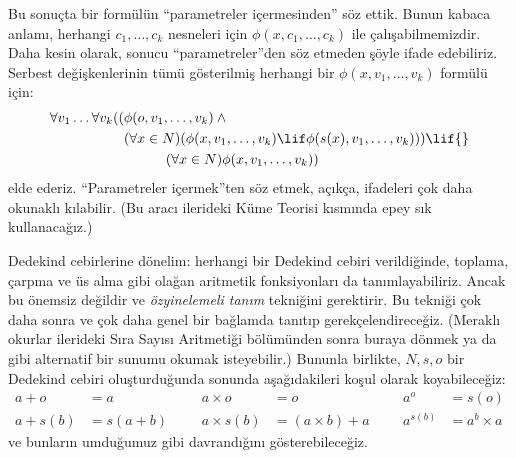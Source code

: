 Bu sonuçta bir formülün ``parametreler içermesinden'' söz ettik. Bunun
kabaca anlamı, herhangi $c_1,\ldots,c_k$ nesneleri için
$\phi(x,c_1,\ldots,c_k)$ ile çalışabilmemizdir. Daha kesin olarak, sonucu
``parametreler''den söz etmeden şöyle ifade edebiliriz. Serbest değişkenlerinin
tümü gösterilmiş herhangi bir $\phi(x,v_1,\ldots,v_k)$ formülü için:
	\begin{align*}
			\forall v_1 \ldots \forall v_k((&\phi(o, v_1,\ldots, v_k) \land {}\\
			&	(\forall x \in N)(\phi(x,v_1, \ldots, v_k) \lif \phi(s(x), v_1,\ldots, v_k))) \lif {}\\
			&\hspace{3em} (\forall x \in N)\phi(x, v_1,\ldots, v_k))
	\end{align*}
elde ederiz. ``Parametreler içermek''ten söz etmek, açıkça, ifadeleri çok
daha okunaklı kılabilir. (Bu aracı ilerideki Küme Teorisi kısmında epey sık
kullanacağız.)

Dedekind cebirlerine dönelim: herhangi bir Dedekind cebiri verildiğinde,
toplama, çarpma ve üs alma gibi olağan aritmetik fonksiyonları da
tanımlayabiliriz. Ancak bu önemsiz değildir ve \emph{özyinelemeli tanım}
tekniğini gerektirir. Bu tekniği çok daha sonra ve çok daha genel bir
bağlamda tanıtıp gerekçelendireceğiz. (Meraklı okurlar ilerideki Sıra Sayısı
Aritmetiği bölümünden sonra buraya dönmek ya da
\citealt[pp.~95--8]{Potter2004} gibi alternatif bir sunumu okumak
isteyebilir.) Bununla birlikte, $N,s,o$ bir Dedekind cebiri oluşturduğunda
sonunda aşağıdakileri koşul olarak koyabileceğiz:
\begin{align*}
	{a} + {o} &= {a} & & & {a} \times {o} &= {o} & & & {a}^{o} &= s(o)\\
{a} + {s}({b}) &= {s}({a}+{b}) &&& {a} \times {s}({b}) &= ({a}\times {b}) + {a}  & & & {a}^{{s}({b})} &= {a}^{b} \times {a}
\end{align*}
ve bunların umduğumuz gibi davrandığını gösterebileceğiz.

